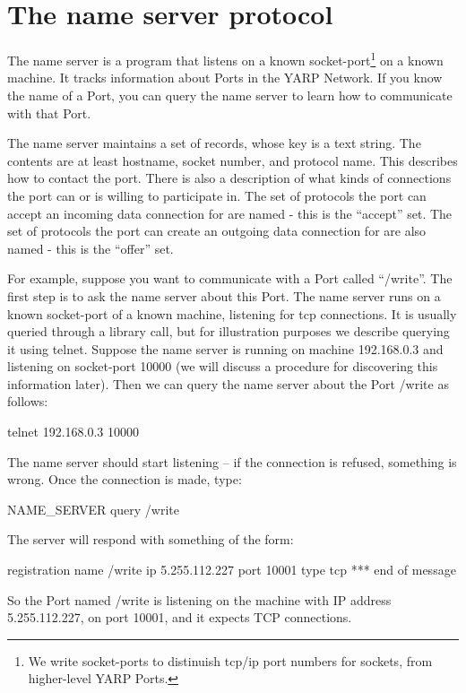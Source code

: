 

\chapter{The name server protocol}

\label{sect:name-protocol}

The name server is a program that listens on a known socket-port\footnote{We
write socket-ports to distinuish tcp/ip port numbers for sockets, 
from higher-level YARP Ports.}
on a known machine.
%
It tracks information about Ports in the YARP Network.
%
%
If you know the name
of a Port, you can query the name server to learn how to communicate
with that Port.

The name server maintains a set of records, whose key is a text
string.  The contents are at least hostname, socket number, and
protocol name.  This describes how to contact the port.  There is also
a description of what kinds of connections the port can or is willing
to participate in.  The set of protocols the port can accept an
incoming data connection for are named - this is the ``accept'' set.
The set of protocols the port can create an outgoing data connection
for are also named - this is the ``offer'' set.

For example, suppose you want to communicate with a Port called
``/write''.  The first step is to ask the name server about this
Port.  The name server runs on a known socket-port of a known machine,
listening for tcp connections.
It is usually queried through a library call, but for illustration
purposes we describe
querying it using telnet.  Suppose the name server is running on
machine 192.168.0.3 and listening on socket-port 10000 (we will
discuss a procedure for discovering this information later).
Then we can query the name server about the Port /write as follows:


\begin{code}
telnet 192.168.0.3 10000
\end{code}
%
The name server should start listening -- if the connection is refused,
something is wrong.  Once the connection is made, type:
%
\begin{code}
NAME_SERVER query /write
\end{code}
%
The server will respond with something of the form:
%
\begin{code}
registration name /write ip 5.255.112.227 port 10001 type tcp
*** end of message
\end{code}
%
So the Port named /write is listening on the machine with
IP address 5.255.112.227, on port 10001, and it expects TCP
connections.


